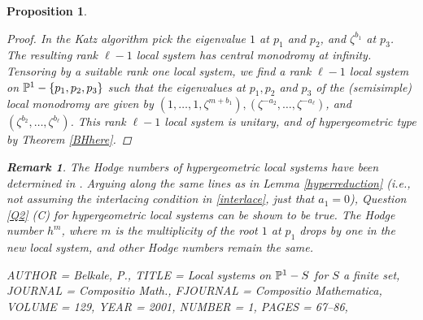 \documentclass[11pt]{amsart}
\newtheorem{remark}[theorem]{ Remark}
\newtheorem{proposition}[theorem]{Proposition}
\numberwithin{theorem}{subsection}
\begin{document}
{\begin{proposition}
\begin{proof}
In the Katz algorithm pick the eigenvalue $1$ at $p_1$ and $p_2$, and $\zeta^{b_1}$ at $p_3$. The resulting rank $\ell-1$  local system has central monodromy at infinity. Tensoring by a suitable rank one local system, we find a rank $\ell-1$ local system on $\Bbb{P}^1-\{p_1,p_2,p_3\}$ such that
the eigenvalues at $p_1,p_2$ and $p_3$ of the (semisimple) local monodromy are given by $(1,\dots,1,\zeta^{m+b_1}), (\zeta^{-a_2},\dots,\zeta^{-a_{\ell}})$, and $(\zeta^{b_2},\dots,\zeta^{b_{\ell}})$. This rank $\ell-1$ local system is unitary, and of hypergeometric type by Theorem \ref{BHhere}.
 \end{proof}
 \begin{remark} \label{Q2rem}
 The Hodge numbers of hypergeometric local systems have been determined in \cite{fedorov}. Arguing along the same lines as in Lemma \ref{hyperreduction} (i.e., not assuming the interlacing condition in \eqref{interlace}, just that $a_1=0$), Question \ref{Q2} (C) for hypergeometric local systems can be shown to be true. The Hodge number $h^m$, where $m$ is the multiplicity of the root $1$ at $p_1$ drops by one in the new local system, and other Hodge numbers remain the same.
\end{remark}

\begin{bibdiv}
\begin{biblist}

{} {
    AUTHOR = {Belkale, P.},
     TITLE = {Local systems on {$\Bbb P^1-S$} for {$S$} a finite set},
   JOURNAL = {Compositio Math.},
  FJOURNAL = {Compositio Mathematica},
    VOLUME = {129},
      YEAR = {2001},
    NUMBER = {1},
     PAGES = {67--86},
}





\end{biblist}
\end{bibdiv}
\end{proposition}}
\end{document}
